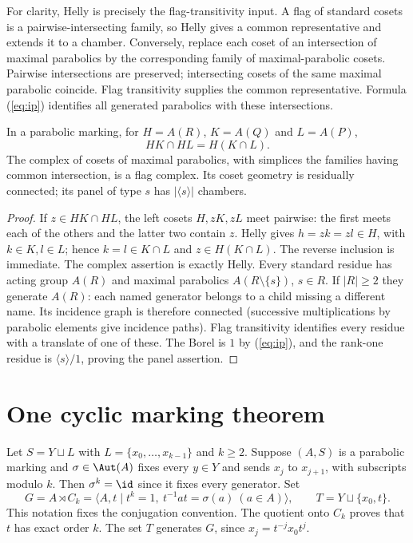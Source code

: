 For clarity, Helly is precisely the flag-transitivity input. A flag of
standard cosets is a pairwise-intersecting family, so Helly gives a common
representative and extends it to a chamber. Conversely, replace each
coset of an intersection of maximal parabolics by the corresponding
family of maximal-parabolic cosets. Pairwise intersections are preserved;
intersecting cosets of the same maximal parabolic coincide. Flag
transitivity supplies the common representative. Formula (\ref{eq:ip})
identifies all generated parabolics with these intersections.

\begin{lemma}\label{lem:product}
In a parabolic marking, for $H=A(R)$, $K=A(Q)$ and $L=A(P)$,
\[
 HK\cap HL=H(K\cap L).
\]
The complex of cosets of maximal parabolics, with simplices the families
having common intersection, is a flag complex. Its coset geometry is
residually connected; its panel of type $s$ has $|\langle s\rangle|$
chambers.
\end{lemma}
\begin{proof}
If $z\in HK\cap HL$, the left cosets $H,zK,zL$ meet pairwise:
the first meets each of the others and the latter two contain $z$.
Helly gives $h=zk=zl\in H$, with $k\in K,l\in L$; hence
$k=l\in K\cap L$ and $z\in H(K\cap L)$. The reverse inclusion
is immediate. The complex assertion is exactly Helly. Every standard
residue has acting group $A(R)$ and maximal parabolics
$A(R\setminus\{s\})$, $s\in R$. If $|R|\geq2$ they generate
$A(R)$: each named generator belongs to a child missing a different
name. Its incidence graph is therefore connected (successive
multiplications by parabolic elements give incidence paths). Flag
transitivity identifies every residue with a translate of one of these.
The Borel is $1$ by (\ref{eq:ip}), and the rank-one residue is
$\langle s\rangle/1$, proving the panel assertion.
\end{proof}

\section{One cyclic marking theorem}
Let $S=Y\sqcup L$ with
$L=\{x_0,\ldots,x_{k-1}\}$ and $k\geq2$. Suppose $(A,S)$ is a
parabolic marking and $\sigma\in\Aut(A)$ fixes every $y\in Y$ and
sends $x_j$ to $x_{j+1}$, with subscripts modulo $k$.
Then $\sigma^k=\id$ since it fixes every generator. Set
\[
 G=A\rtimes C_k=\langle A,t\mid t^k=1,\ t^{-1}at=\sigma(a)
 \ (a\in A)\rangle,
 \qquad T=Y\sqcup\{x_0,t\}.
\]
This notation fixes the conjugation convention. The quotient onto $C_k$
proves that $t$ has exact order $k$. The set $T$ generates $G$, since
$x_j=t^{-j}x_0t^j$.

